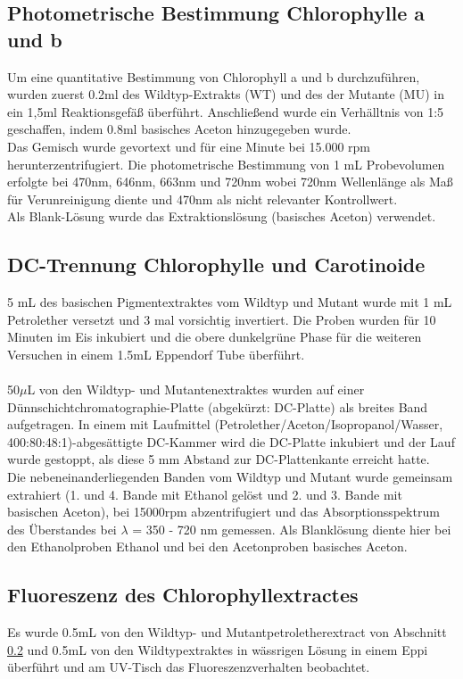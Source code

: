 \documentclass[10pt,a4paper]{article}
\begin{document}
		\subsection{Photometrische Bestimmung Chlorophylle a und b}
		Um eine quantitative Bestimmung von  Chlorophyll a und b durchzuführen, wurden zuerst 0.2ml  des Wildtyp-Extrakts (WT) und des der Mutante (MU) in ein 1,5ml Reaktionsgefäß überführt. Anschließend wurde ein Verhälltnis von 1:5 geschaffen, indem 0.8ml basisches Aceton hinzugegeben wurde.  \\
		Das Gemisch wurde gevortext und für eine Minute bei 15.000 rpm herunterzentrifugiert.
		Die photometrische Bestimmung von 1 mL Probevolumen erfolgte bei 470nm, 646nm, 663nm und 720nm wobei 720nm Wellenlänge als Maß für Verunreinigung diente und 470nm als nicht relevanter Kontrollwert.\\
		Als Blank-Lösung wurde das Extraktionslösung (basisches Aceton) verwendet.
		
		\subsection{DC-Trennung Chlorophylle und Carotinoide}\label{text: DC}
		5 mL des basischen Pigmentextraktes vom Wildtyp und Mutant wurde mit 1 mL Petrolether versetzt und 3 mal vorsichtig invertiert.
		Die Proben wurden für 10 Minuten im Eis inkubiert und die obere dunkelgrüne Phase für die weiteren Versuchen in einem 1.5mL Eppendorf Tube überführt.\\
		\\
		50$\mu$L von den Wildtyp- und Mutantenextraktes wurden auf einer Dünnschichtchromatographie-Platte (abgekürzt: DC-Platte) als breites Band aufgetragen.
		In einem mit Laufmittel (Petrolether/Aceton/Isopropanol/Wasser, 400:80:48:1)-abgesättigte DC-Kammer wird die DC-Platte inkubiert und der Lauf wurde gestoppt, als diese 5 mm Abstand zur DC-Plattenkante erreicht hatte.\\
		Die nebeneinanderliegenden Banden vom Wildtyp und Mutant wurde gemeinsam extrahiert (1. und 4. Bande mit Ethanol gelöst und 2. und 3. Bande mit basischen Aceton), bei 15000rpm abzentrifugiert und das Absorptionsspektrum des Überstandes bei $\lambda$ = 350 - 720 nm gemessen. Als Blanklösung diente hier bei den Ethanolproben Ethanol und bei den Acetonproben basisches Aceton.
		\subsection{Fluoreszenz des Chlorophyllextractes}
		Es wurde 0.5mL von den Wildtyp- und Mutantpetroletherextract von Abschnitt \ref{text: DC} und 0.5mL von den Wildtypextraktes in wässrigen Lösung in einem Eppi überführt und am UV-Tisch das Fluoreszenzverhalten beobachtet.
		
\end{document}
